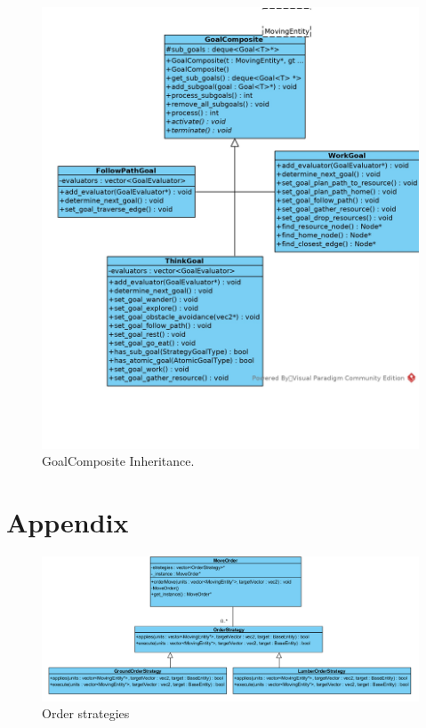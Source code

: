 \begin{figure}[!htb]
    \centering
    \includegraphics{res/GoalComposite-Inherit.jpg}
    \caption{GoalComposite Inheritance.}\label{fig:goalcomposite-inherit}
\end{figure}
\section{Appendix}
\begin{figure}[!htb]
    \centering
    \includegraphics[angle=-90,origin=c,scale=0.65]
    {images/order-strategies.PNG}
    \caption{Order strategies}\label{fig:orderstrategies}
\end{figure}
